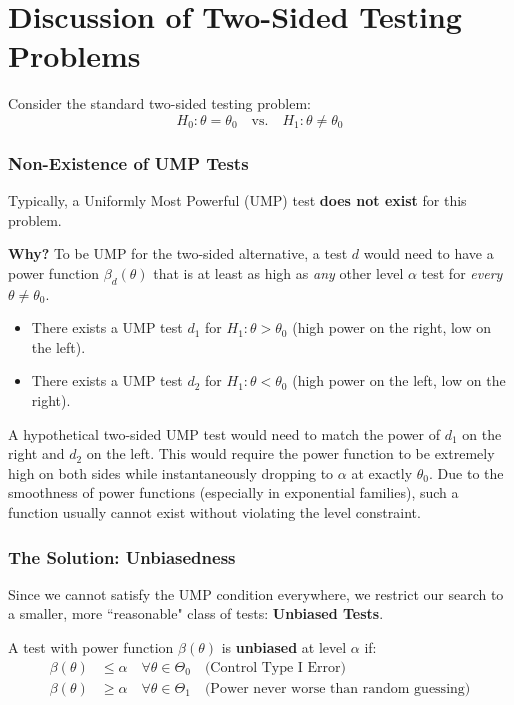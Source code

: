 \section{Discussion of Two-Sided Testing Problems}
\label{sec:two_sided_testing}

Consider the standard two-sided testing problem:
\[ H_0: \theta = \theta_0 \quad \text{vs.} \quad H_1: \theta \neq \theta_0 \]

\subsubsection{Non-Existence of UMP Tests}
Typically, a Uniformly Most Powerful (UMP) test \textbf{does not exist} for this problem.

\textbf{Why?}
To be UMP for the two-sided alternative, a test $d$ would need to have a power function $\beta_d(\theta)$ that is at least as high as \textit{any} other level $\alpha$ test for \textit{every} $\theta \neq \theta_0$.
\begin{itemize}
    \item There exists a UMP test $d_1$ for $H_1: \theta > \theta_0$ (high power on the right, low on the left).
    \item There exists a UMP test $d_2$ for $H_1: \theta < \theta_0$ (high power on the left, low on the right).
\end{itemize}
A hypothetical two-sided UMP test would need to match the power of $d_1$ on the right and $d_2$ on the left. This would require the power function to be extremely high on both sides while instantaneously dropping to $\alpha$ at exactly $\theta_0$. Due to the smoothness of power functions (especially in exponential families), such a function usually cannot exist without violating the level constraint.

\subsubsection{The Solution: Unbiasedness}
Since we cannot satisfy the UMP condition everywhere, we restrict our search to a smaller, more ``reasonable" class of tests: \textbf{Unbiased Tests}.

\begin{definition}
A test with power function $\beta(\theta)$ is \textbf{unbiased} at level $\alpha$ if:
\begin{align*}
    \beta(\theta) &\le \alpha \quad \forall \theta \in \Theta_0 \quad \text{(Control Type I Error)} \\
    \beta(\theta) &\ge \alpha \quad \forall \theta \in \Theta_1 \quad \text{(Power never worse than random guessing)}
\end{align*}
\end{definition}

